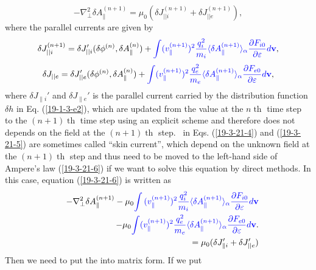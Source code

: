 \documentclass{article}
\newcommand{\tmcolor}[2]{{\color{#1}{#2}}}
\newcommand{\tmop}[1]{\ensuremath{\operatorname{#1}}}
\begin{document}
\begin{equation}
  \label{19-3-21-6} - \nabla^2_{\perp} \delta A_{\parallel}^{(n + 1)} = \mu_0 
  (\delta J_{||i}^{(n + 1)} + \delta J_{||e}^{(n + 1)}),
\end{equation}
where the parallel currents are given by
\begin{equation}
  \label{19-3-21-4} \delta J_{|| i}^{(n + 1)} = \delta J_{|| i}' (\delta
  \phi^{(n)}, \delta A_{\parallel}^{(n)}) + \tmcolor{blue}{\int
  (v_{\parallel}^{(n + 1)})^2 \frac{q^2_i}{m_i} \langle \delta
  A_{\parallel}^{(n + 1)} \rangle_{\alpha} \frac{\partial F_{i 0}}{\partial
  \varepsilon} d\mathbf{v}},
\end{equation}
\begin{equation}
  \label{19-3-21-5} \delta J_{|| e} = \delta J_{|| e}' (\delta \phi^{(n)},
  \delta A_{\parallel}^{(n)}) + \tmcolor{blue}{\int (v_{\parallel}^{(n +
  1)})^2 \frac{q^2_e}{m_e} \langle \delta A_{\parallel}^{(n + 1)}
  \rangle_{\alpha} \frac{\partial F_{e 0}}{\partial \varepsilon} d\mathbf{v}},
\end{equation}
where $\delta J_{\parallel i}'$ and $\delta J_{\parallel e}'$ is the parallel
current carried by the distribution function $\delta h$ in Eq.
(\ref{19-1-3-e2}), which are updated from the value at the $n \tmop{th}$ time
step to the $(n + 1) \tmop{th}$ time step using an explicit scheme and
therefore does not depends on the field at the $(n + 1) \tmop{th}$ step.
\tmcolor{blue}{The blue terms} \ in Eqs. (\ref{19-3-21-4}) and
(\ref{19-3-21-5}) are sometimes called ``skin current'', which depend on the
unknown field at the $(n + 1) \tmop{th}$ step and thus need to be moved to the
left-hand side of Ampere's law (\ref{19-3-21-6}) if we want to solve this
equation by direct methods. In this case, equation (\ref{19-3-21-6}) is
written as
\begin{eqnarray}
  &  & - \nabla^2_{\perp} \delta A_{\parallel}^{(n + 1)} - \mu_0
  \tmcolor{blue}{\int {(v_{\parallel}^{(n + 1)})^2}  \frac{q^2_i}{m_i} \langle
  \delta A_{\parallel}^{(n + 1)} \rangle_{\alpha} \frac{\partial F_{i
  0}}{\partial \varepsilon} d\mathbf{v}} \nonumber\\
  &  & - \mu_0 \tmcolor{blue}{\int (v_{\parallel}^{(n + 1)})^2
  \frac{q^2_e}{m_e} \langle \delta A_{\parallel}^{(n + 1)} \rangle_{\alpha}
  \frac{\partial F_{e 0}}{\partial \varepsilon} d\mathbf{v}} . \nonumber\\
  &  & = \mu_0  (\delta J_{\parallel i}' + \delta J'_{||e}) 
\end{eqnarray}
Then we need to put the \tmcolor{blue}{blue terms} into matrix form. If we put
\end{document}
